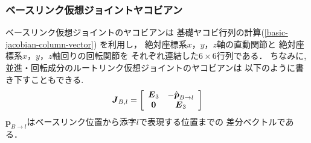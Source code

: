 

\subsubsection{ベースリンク仮想ジョイントヤコビアン}
ベースリンク仮想ジョイントのヤコビアンは
基礎ヤコビ行列の計算(\eqref{basic-jacobian-column-vector})
を利用し，
絶対座標系$x$，$y$，$z$軸の直動関節と
絶対座標系$x$，$y$，$z$軸回りの回転関節を
それぞれ連結した$6\times6$行列である．
ちなみに,並進・回転成分のルートリンク仮想ジョイントのヤコビアンは
以下のように書き下すこともできる.
\begin{eqnarray}
\labeq{virtual-joint-jacobian}
\bm{J}_{B,l} = 
\left[
\begin{array}{cc}
\bm{E}_3 &
-\hat{\bm{p}}_{B\to l}\\
\bm{0} & \bm{E}_3
\end{array}
\right]
\end{eqnarray}
$\bm{p}_{B\to l}$はベースリンク位置から添字$l$で表現する位置までの
差分ベクトルである．

